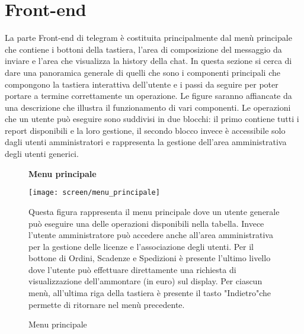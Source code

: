 \clearpage
\section{Front-end}

La parte Front-end di telegram è costituita principalmente dal menù principale che contiene i bottoni della tastiera, l'area di composizione del messaggio da inviare e l'area che visualizza la history della chat. In questa sezione si cerca di dare una panoramica generale di quelli che sono i componenti principali che compongono la tastiera interattiva dell'utente e i passi da seguire per poter portare a termine correttamente un operazione. Le figure saranno affiancate da una descrizione che illustra il funzionamento di vari componenti. 
Le operazioni che un utente può eseguire sono suddivisi in due blocchi: il primo contiene tutti i report disponibili e la loro gestione, il secondo blocco invece è accessibile solo dagli utenti amministratori e rappresenta la gestione dell'area amministrativa degli utenti generici. \\


\begin{figure}[h!]
\begin{center} \textbf{Menu principale} \end{center}
\begin{center}
    \texttt{[image: screen/menu\_principale]} 
    \caption{Menu principale}
    \end{center}
Questa figura rappresenta il menu principale dove un utente generale può eseguire una delle operazioni disponibili nella tabella. Invece l'utente amministratore può accedere anche all'area amministrativa per la gestione delle licenze e l'associazione degli utenti. Per il bottone di Ordini, Scadenze e Spedizioni è presente l'ultimo livello dove l'utente può effettuare direttamente una richiesta di visualizzazione dell'ammontare (in euro) sul display. Per ciascun menù, all'ultima riga della tastiera è presente il tasto "Indietro"che permette di ritornare nel menù precedente. 
\end{figure}  




